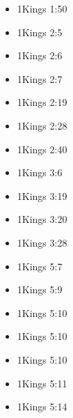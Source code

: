 \documentclass[14pt]{book}
\begin{document}
			\begin{multicols}{2}\begin{itemize}
							
							\item 1Kings 1:50
							
							\item 1Kings 2:5
							
							\item 1Kings 2:6
							
							\item 1Kings 2:7
							
							\item 1Kings 2:19
							
							\item 1Kings 2:28
									
									\item 1Kings 2:40
									
									\item 1Kings 3:6
									
									\item 1Kings 3:19
									
									\item 1Kings 3:20
									
									\item 1Kings 3:28
									
									\item 1Kings 5:7
									
									\item 1Kings 5:9
									
									\item 1Kings 5:10
									
									\item 1Kings 5:10
									
									\item 1Kings 5:10
									
									\item 1Kings 5:11
									
									\item 1Kings 5:14
									

\end{itemize}
\end{multicols}
\end{document}
